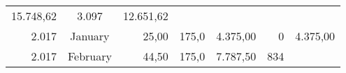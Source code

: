 \documentclass[11pt,A4paper,]{article}
\begin{document}
\begin{longtable}[]{@{}rcrrrrr@{}}
\begin{minipage}[t]{0.13\columnwidth}
15.748,62\strut
\end{minipage} & \begin{minipage}[t]{0.09\columnwidth}\raggedleft\strut
3.097\strut
\end{minipage} & \begin{minipage}[t]{0.20\columnwidth}\raggedleft\strut
12.651,62\strut
\end{minipage}\tabularnewline
\begin{minipage}[t]{0.09\columnwidth}\raggedleft\strut
2.017\strut
\end{minipage} & \begin{minipage}[t]{0.13\columnwidth}\centering\strut
January\strut
\end{minipage} & \begin{minipage}[t]{0.09\columnwidth}\raggedleft\strut
25,00\strut
\end{minipage} & \begin{minipage}[t]{0.09\columnwidth}\raggedleft\strut
175,0\strut
\end{minipage} & \begin{minipage}[t]{0.13\columnwidth}\raggedleft\strut
4.375,00\strut
\end{minipage} & \begin{minipage}[t]{0.09\columnwidth}\raggedleft\strut
0\strut
\end{minipage} & \begin{minipage}[t]{0.20\columnwidth}\raggedleft\strut
4.375,00\strut
\end{minipage}\tabularnewline
\begin{minipage}[t]{0.09\columnwidth}\raggedleft\strut
2.017\strut
\end{minipage} & \begin{minipage}[t]{0.13\columnwidth}\centering\strut
February\strut
\end{minipage} & \begin{minipage}[t]{0.09\columnwidth}\raggedleft\strut
44,50\strut
\end{minipage} & \begin{minipage}[t]{0.09\columnwidth}\raggedleft\strut
175,0\strut
\end{minipage} & \begin{minipage}[t]{0.13\columnwidth}\raggedleft\strut
7.787,50\strut
\end{minipage} & \begin{minipage}[t]{0.09\columnwidth}\raggedleft\strut
834\strut
\end{minipage} & \begin{minipage}[t]{0.20\columnwidth}\raggedleft\strut

\end{minipage}
\end{longtable}
\end{document}
